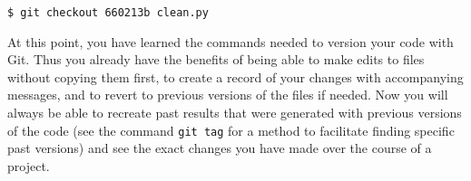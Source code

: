 \begin{verbatim}
$ git checkout 660213b clean.py
\end{verbatim}

At this point, you have learned the commands needed to version your code with Git.
Thus you already have the benefits of being able to make edits to files without copying them first, to create a record of your changes with accompanying messages, and to revert to previous versions of the files if needed.
Now you will always be able to recreate past results that were generated with previous versions of the code (see the command \verb|git tag| for a method to facilitate finding specific past versions) and see the exact changes you have made over the course of a project.
